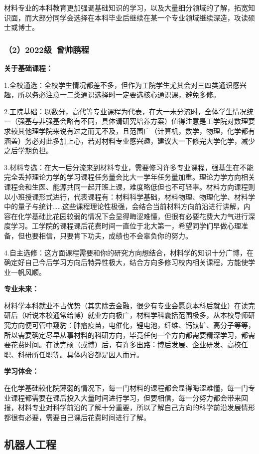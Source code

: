 \documentclass[11pt,oneside]{book}
\begin{document}
材料专业的本科教育更加强调基础知识的学习，以及大量细分领域的了解，拓宽知识面，而大部分同学会选择在本科毕业后继续在某一个专业领域继续深造，攻读硕士或博士。
\subsubsection{（2）2022级\ 曾帅鹏程}
\textbf{关于基础课程：}

1.全校通选：全校学生情况都差不多，但作为工院学生尤其会对三四类通识感兴趣，所以务必注意一二类通识选择时一定要选核心通识课，避免多修。

2.工院基础：以数分，高代等专业课程为代表，在大一未分流时，全体学生情况统一（强基与非强基会略有不同，具体请研究培养方案）值得注意是工学院对数理要求较其他理学院来说有过之而无不及，且范围广（计算机，数学，物理，化学都有涵盖）务必对此多加上心，若对材料专业感兴趣，建议大一下修完大学化学，减少之后学期负担。

3.材料专选：在大一后分流来到材料专业，需要修习许多专业课程，强基生在不能完全丢掉理论力学的学习课程任务量会比大一学年任务量加重。理论力学方向相关课程会和生医、能源共同一起开班上课，难度略低但也不可轻率。材料方向课程则以小班授课形式进行，代表课程有：材料科学基础，材料物理、物理化学、材料学中的量子与统计……这些课程理论性极强，会结合当前材料方向前沿进行讲解，内容在化学基础比花园较弱的情况下会显得晦涩难懂，但很有必要花费大力气进行深度学习。工学院的课程课后花费时间一直位于北大第一，希望同学们早做心理准备，但也要相信，只要肯下功夫，成绩也不会辜负你的努力。

4.自主选修：这方面课程需要和你的研究方向想结合，材料学的知识十分广博，在确定好自己今后学习方向后特异性极大，结合方向多修习校内相关课程，方能使学业一帆风顺。

\textbf{专业未来：}

材料学本科就业不占优势（其实除去金融，很少有专业会愿意本科后就业）在读完研后（听说本校通常给博）就业方向极广，材料学科囊括范围极多，从本校导师研究方向便可管中窥豹：肿瘤疫苗，电催化，锂电池，纤维、钙钛矿、高分子等等，所以需要确定尽早从事材料的科研方向，毕竟任何一个方向都需要精深学习，都需要花费时间。在读完硕（或博）后，有许多出路：博后发展、企业研发、高校任职、科研所任职等。具体内容都是因人而异。

\textbf{学习体会：}

在化学基础较化院薄弱的情况下，每一门材料的课程都会显得晦涩难懂，每一门专业课程都需要在课后投入大量时间进行学习，但要相信，每一分努力都会带来回报，材料专业对科学前沿的了解十分重要，所以了解自己方向的科学前沿发展情形都很有必要，需要自己课后花费时间进行了解。


\subsection{机器人工程}
\end{document}
